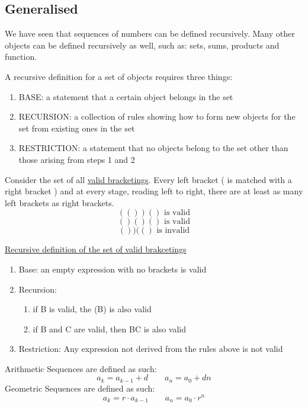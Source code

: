 \subsection{Generalised}
We have seen that sequences of numbers can be defined recursively. Many other objects can be defined recursively as well, such as: sets, sums, products and function.

A recursive definition for a set of objects requires three things:
\begin{enumerate}
    \item BASE: a statement that a certain object belongs in the set
    \item RECURSION: a collection of rules showing how to form new objects for the set from existing ones in the set
    \item RESTRICTION: a statement that no objects belong to the set other than those arising from steps 1 and 2
\end{enumerate}

\begin{example}
    Consider the set of all \underline{valid bracketings}. Every left bracket ( is matched with a right bracket ) and at every stage, reading left to right, there are at least as many left brackets as right brackets.
    $$(())()\text{ is valid}$$
    $$()()()\text{ is valid}$$
    $$())(()\text{ is invalid}$$

    \underline{Recursive definition of the set of valid brakcetings}
    \begin{enumerate}
        \item Base: an empty expression with no brackets is valid
        \item Recursion: \begin{enumerate}
            \item if B is valid, the (B) is also valid
            \item if B and C are valid, then BC is also valid
        \end{enumerate}
        \item Restriction: Any expression not derived from the rules above is not valid
    \end{enumerate}
\end{example}

\begin{definition}
    Arithmetic Sequences are defined as such:
    \[a_k = a_{k-1} + d \qquad a_n = a_0 +dn\]
    Geometric Sequences are defined as such:
    \[a_k = r\cdot a_{k-1} \qquad a_n = a_0\cdot r^n\]
\end{definition}

